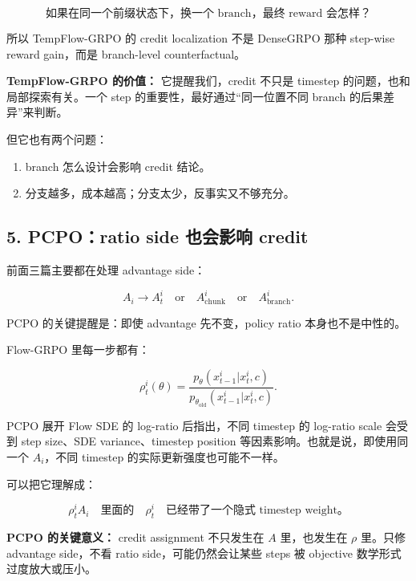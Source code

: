 \[
\text{如果在同一个前缀状态下，换一个 branch，最终 reward 会怎样？}
\]

所以 TempFlow-GRPO 的 credit localization 不是 DenseGRPO 那种 step-wise reward gain，而是 branch-level counterfactual。

\begin{summarybox}
\textbf{TempFlow-GRPO 的价值：} 它提醒我们，credit 不只是 timestep 的问题，也和局部探索有关。一个 step 的重要性，最好通过“同一位置不同 branch 的后果差异”来判断。
\end{summarybox}

但它也有两个问题：

\begin{enumerate}[leftmargin=1.5em]
  \item branch 怎么设计会影响 credit 结论。
  \item 分支越多，成本越高；分支太少，反事实又不够充分。
\end{enumerate}

\subsection{5. PCPO：ratio side 也会影响 credit}

前面三篇主要都在处理 advantage side：

\[
A_i
\rightarrow
A_t^i
\quad \text{or} \quad
A_{\mathrm{chunk}}^i
\quad \text{or} \quad
A_{\mathrm{branch}}^i.
\]

PCPO 的关键提醒是：即使 advantage 先不变，policy ratio 本身也不是中性的。

Flow-GRPO 里每一步都有：

\[
\rho_t^i(\theta)
=
\frac{
p_\theta(x_{t-1}^i|x_t^i,c)
}{
p_{\theta_{\mathrm{old}}}(x_{t-1}^i|x_t^i,c)
}.
\]

PCPO 展开 Flow SDE 的 log-ratio 后指出，不同 timestep 的 log-ratio scale 会受到 step size、SDE variance、timestep position 等因素影响。也就是说，即使用同一个 \(A_i\)，不同 timestep 的实际更新强度也可能不一样。

可以把它理解成：

\[
\rho_t^i A_i
\quad
\text{里面的}
\quad
\rho_t^i
\quad
\text{已经带了一个隐式 timestep weight。}
\]

\begin{warnbox}
\textbf{PCPO 的关键意义：} credit assignment 不只发生在 \(A\) 里，也发生在 \(\rho\) 里。只修 advantage side，不看 ratio side，可能仍然会让某些 steps 被 objective 数学形式过度放大或压小。
\end{warnbox}

